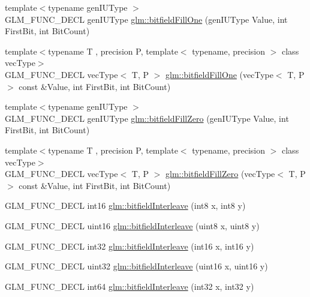 \begin{DoxyCompactItemize}
\item 
{\footnotesize template$<$typename gen\-I\-U\-Type $>$ }\\G\-L\-M\-\_\-\-F\-U\-N\-C\-\_\-\-D\-E\-C\-L gen\-I\-U\-Type \hyperlink{group__gtc__bitfield_ga46f9295abe3b5c7658f5b13c7f819f0a}{glm\-::bitfield\-Fill\-One} (gen\-I\-U\-Type Value, int First\-Bit, int Bit\-Count)
\item 
{\footnotesize template$<$typename T , precision P, template$<$ typename, precision $>$ class vec\-Type$>$ }\\G\-L\-M\-\_\-\-F\-U\-N\-C\-\_\-\-D\-E\-C\-L vec\-Type$<$ T, P $>$ \hyperlink{group__gtc__bitfield_gad789042e84e8292ae95dc1af856f2ad5}{glm\-::bitfield\-Fill\-One} (vec\-Type$<$ T, P $>$ const \&Value, int First\-Bit, int Bit\-Count)
\item 
{\footnotesize template$<$typename gen\-I\-U\-Type $>$ }\\G\-L\-M\-\_\-\-F\-U\-N\-C\-\_\-\-D\-E\-C\-L gen\-I\-U\-Type \hyperlink{group__gtc__bitfield_ga697b86998b7d74ee0a69d8e9f8819fee}{glm\-::bitfield\-Fill\-Zero} (gen\-I\-U\-Type Value, int First\-Bit, int Bit\-Count)
\item 
{\footnotesize template$<$typename T , precision P, template$<$ typename, precision $>$ class vec\-Type$>$ }\\G\-L\-M\-\_\-\-F\-U\-N\-C\-\_\-\-D\-E\-C\-L vec\-Type$<$ T, P $>$ \hyperlink{group__gtc__bitfield_gaddba3196316b0bd240295b09b43c2958}{glm\-::bitfield\-Fill\-Zero} (vec\-Type$<$ T, P $>$ const \&Value, int First\-Bit, int Bit\-Count)
\item 
G\-L\-M\-\_\-\-F\-U\-N\-C\-\_\-\-D\-E\-C\-L int16 \hyperlink{group__gtc__bitfield_ga479134317bc95d99f2b2e235d3db287b}{glm\-::bitfield\-Interleave} (int8 x, int8 y)
\item 
G\-L\-M\-\_\-\-F\-U\-N\-C\-\_\-\-D\-E\-C\-L uint16 \hyperlink{group__gtc__bitfield_ga0700a3ceb088a0ecc23d76c154096061}{glm\-::bitfield\-Interleave} (uint8 x, uint8 y)
\item 
G\-L\-M\-\_\-\-F\-U\-N\-C\-\_\-\-D\-E\-C\-L int32 \hyperlink{group__gtc__bitfield_ga1a0264598647ae00a596865af4e1e878}{glm\-::bitfield\-Interleave} (int16 x, int16 y)
\item 
G\-L\-M\-\_\-\-F\-U\-N\-C\-\_\-\-D\-E\-C\-L uint32 \hyperlink{group__gtc__bitfield_ga19ef8360379483e3ee245e89cb62ff93}{glm\-::bitfield\-Interleave} (uint16 x, uint16 y)
\item 
G\-L\-M\-\_\-\-F\-U\-N\-C\-\_\-\-D\-E\-C\-L int64 \hyperlink{group__gtc__bitfield_ga0de51d5985e6a703f305a5a61479babd}{glm\-::bitfield\-Interleave} (int32 x, int32 y)

\end{DoxyCompactItemize}
